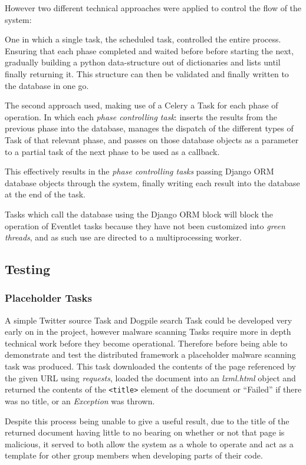 However two different technical approaches were applied to control the flow of the system:

One in which a single task, the scheduled task, controlled the entire process.  Ensuring that each phase completed and waited before before starting the next, gradually building a python data-structure out of dictionaries and lists until finally returning it.  This structure can then be validated and finally written to the database in one go.

The second approach used, making use of a Celery a Task for each phase of operation.  In which each \emph{phase controlling task}: inserts the results from the previous phase into the database, manages the dispatch of the different types of Task of that relevant phase, and passes on those database objects as a parameter to a partial task of the next phase to be used as a callback. 

This effectively results in the \emph{phase controlling tasks} passing Django ORM database objects through the system, finally writing each result into the database at the end of the task.

Tasks which call the database using the Django ORM block will block the operation of Eventlet tasks because they have not been customized into \emph{green threads}, and as such use are directed to a multiprocessing worker.

\subsection{Testing}
\subsubsection{Placeholder Tasks}
A simple Twitter source Task and Dogpile search Task could be developed very early on in the project, however malware scanning Tasks require more in depth technical work before they become operational. Therefore 
before being able to demonstrate and test the distributed framework a placeholder malware scanning task was produced. This task downloaded the contents of the page referenced by the given URL using \emph{requests}, loaded the document into an \emph{lxml.html} object and returned the contents of the \verb`<title>` element of the document or ``Failed'' if there was no title, or an \emph{Exception} was thrown.

Despite this process being unable to give a useful result, due to the title of the returned document having little to no bearing on whether or not that page is malicious, it served to both allow the system as a whole to operate and act as a template for other group members when developing parts of their code.

